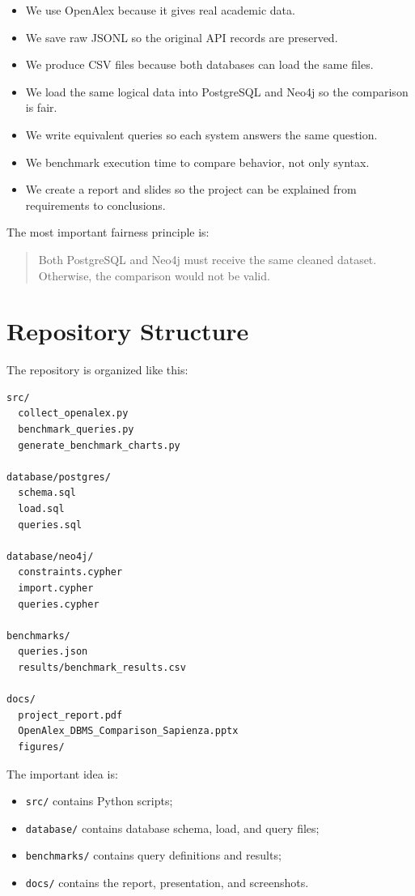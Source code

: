 \documentclass[11pt]{article}
\begin{document}
\begin{itemize}
    \item We use OpenAlex because it gives real academic data.
    \item We save raw JSONL so the original API records are preserved.
    \item We produce CSV files because both databases can load the same files.
    \item We load the same logical data into PostgreSQL and Neo4j so the comparison is fair.
    \item We write equivalent queries so each system answers the same question.
    \item We benchmark execution time to compare behavior, not only syntax.
    \item We create a report and slides so the project can be explained from requirements to conclusions.
\end{itemize}

The most important fairness principle is:

\begin{quote}
Both PostgreSQL and Neo4j must receive the same cleaned dataset.
Otherwise, the comparison would not be valid.
\end{quote}

\section{Repository Structure}

The repository is organized like this:

\begin{verbatim}
src/
  collect_openalex.py
  benchmark_queries.py
  generate_benchmark_charts.py

database/postgres/
  schema.sql
  load.sql
  queries.sql

database/neo4j/
  constraints.cypher
  import.cypher
  queries.cypher

benchmarks/
  queries.json
  results/benchmark_results.csv

docs/
  project_report.pdf
  OpenAlex_DBMS_Comparison_Sapienza.pptx
  figures/
\end{verbatim}

The important idea is:

\begin{itemize}
    \item \texttt{src/} contains Python scripts;
    \item \texttt{database/} contains database schema, load, and query files;
    \item \texttt{benchmarks/} contains query definitions and results;
    \item \texttt{docs/} contains the report, presentation, and screenshots.
\end{itemize}
\end{document}
